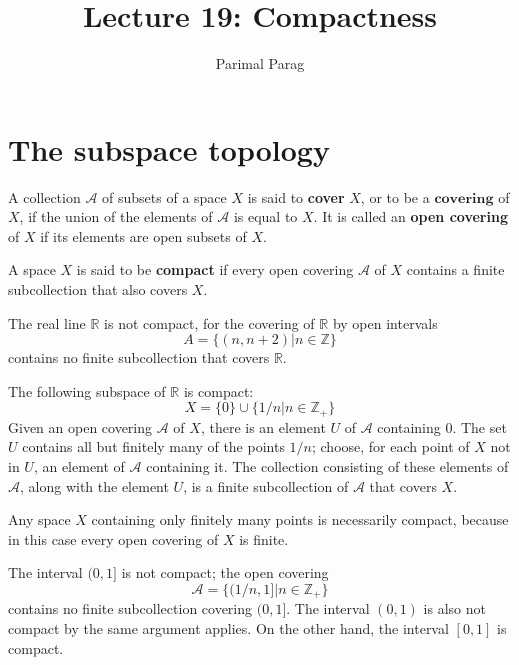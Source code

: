 \documentclass[a4paper,english,12pt]{article}
\title{Lecture 19: Compactness}
\author{Parimal Parag}
\begin{document}
\maketitle

\section{The subspace topology}
\begin{defn}
	A collection $\mathcal{A}$ of subsets of a space $X$ is said to \textbf{cover} $X$, or to be a $\textbf{covering}$ of $X$, if the union of the elements of $\mathcal{A}$ is equal to $X$. It is called an \textbf{open covering} of $X$ if its elements are open subsets of $X$.
\end{defn}
	
\begin{defn}	
	A space $X$ is said to be \textbf{compact} if every open covering $\mathcal{A}$ of $X$ contains a finite subcollection that also covers $X$.
\end{defn}	

\begin{exmp}
	The real line $\mathbb{R}$ is not compact, for the covering of $\mathbb{R}$ by open intervals
	\[ A = \{(n,n+2) | n \in \mathbb{Z}\} \]
	contains no finite subcollection that covers $\mathbb{R}$.
\end{exmp}

\begin{exmp}
	The following subspace of $\mathbb{R}$ is compact:
	\[ X= \{0\} \cup \{1/n | n \in \mathbb{Z_+}\}\]
	Given an open covering $\mathcal{A}$ of $X$, there is an element $U$ of $\mathcal{A}$ containing $0$. The set $U$ contains all but finitely many of the points $1/n$; choose, for each point of $X$ not in $U$, an element of $\mathcal{A}$ containing it. The collection consisting of these elements of $\mathcal{A}$, along with the element $U$, is a finite subcollection of $\mathcal{A}$ that covers $X$.
\end{exmp}

\begin{exmp}
	Any space $X$ containing only finitely many points is necessarily compact, because in this case every open covering of $X$ is finite.
\end{exmp}

\begin{exmp}
	The interval $(0,1]$ is not compact; the open covering
	\[	\mathcal{A} = \{(1/n,1] | n \in \mathbb{Z_+}\}  \]
	contains no finite subcollection covering $(0, 1]$. The interval $(0, 1)$ is also not compact by the same argument applies. On the other hand, the interval $[0, 1]$ is compact.
\end{exmp}
\end{document}
